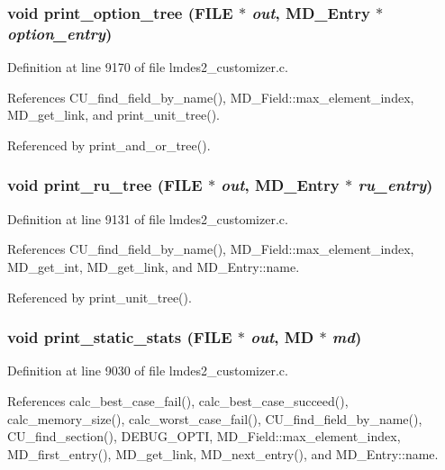 \subsubsection{\setlength{\rightskip}{0pt plus 5cm}void print\_\-option\_\-tree (FILE $\ast$ {\em out}, \bf{MD\_\-Entry} $\ast$ {\em option\_\-entry})}\label{lmdes2__customizer_8c_403032539b9119ba7e8100ea00975277}




Definition at line 9170 of file lmdes2\_\-customizer.c.

References CU\_\-find\_\-field\_\-by\_\-name(), MD\_\-Field::max\_\-element\_\-index, MD\_\-get\_\-link, and print\_\-unit\_\-tree().

Referenced by print\_\-and\_\-or\_\-tree().
\subsubsection{\setlength{\rightskip}{0pt plus 5cm}void print\_\-ru\_\-tree (FILE $\ast$ {\em out}, \bf{MD\_\-Entry} $\ast$ {\em ru\_\-entry})}\label{lmdes2__customizer_8c_fb00d3f1fdaa1c335512b34734911cd3}




Definition at line 9131 of file lmdes2\_\-customizer.c.

References CU\_\-find\_\-field\_\-by\_\-name(), MD\_\-Field::max\_\-element\_\-index, MD\_\-get\_\-int, MD\_\-get\_\-link, and MD\_\-Entry::name.

Referenced by print\_\-unit\_\-tree().
\subsubsection{\setlength{\rightskip}{0pt plus 5cm}void print\_\-static\_\-stats (FILE $\ast$ {\em out}, \bf{MD} $\ast$ {\em md})}\label{lmdes2__customizer_8c_b970674a582a8ea1ad5140f669f34581}




Definition at line 9030 of file lmdes2\_\-customizer.c.

References calc\_\-best\_\-case\_\-fail(), calc\_\-best\_\-case\_\-succeed(), calc\_\-memory\_\-size(), calc\_\-worst\_\-case\_\-fail(), CU\_\-find\_\-field\_\-by\_\-name(), CU\_\-find\_\-section(), DEBUG\_\-OPTI, MD\_\-Field::max\_\-element\_\-index, MD\_\-first\_\-entry(), MD\_\-get\_\-link, MD\_\-next\_\-entry(), and MD\_\-Entry::name.

